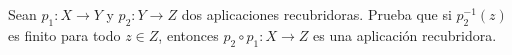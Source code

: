 \begin{ejercicio}
    Sean $p_1:X\to Y$ y $p_2:Y\to Z$ dos aplicaciones recubridoras. Prueba que si $p_2^{-1}(z)$ es finito para todo $z\in Z$, entonces $p_2\circ p_1:X\to Z$ es una aplicación recubridora. %


\end{ejercicio}

